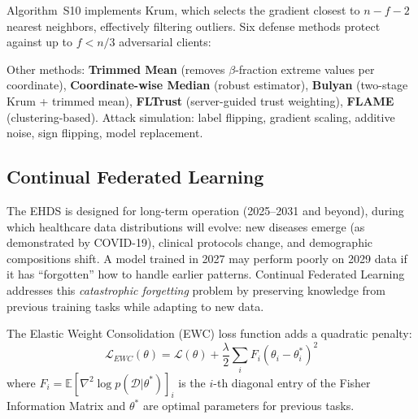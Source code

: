 \documentclass[conference,a4paper]{IEEEtran}
\begin{document}
Algorithm~S10 implements Krum, which selects the gradient closest to $n{-}f{-}2$ nearest neighbors, effectively filtering outliers. Six defense methods protect against up to $f < n/3$ adversarial clients:

\begin{figure}[htbp]
\centering
{}
\end{figure}

Other methods: \textbf{Trimmed Mean} (removes $\beta$-fraction extreme values per coordinate), \textbf{Coordinate-wise Median} (robust estimator), \textbf{Bulyan} (two-stage Krum + trimmed mean), \textbf{FLTrust} (server-guided trust weighting), \textbf{FLAME} (clustering-based). Attack simulation: label flipping, gradient scaling, additive noise, sign flipping, model replacement.

\subsection{Continual Federated Learning}

The EHDS is designed for long-term operation (2025--2031 and beyond), during which healthcare data distributions will evolve: new diseases emerge (as demonstrated by COVID-19), clinical protocols change, and demographic compositions shift. A model trained in 2027 may perform poorly on 2029 data if it has ``forgotten'' how to handle earlier patterns. Continual Federated Learning addresses this \textit{catastrophic forgetting} problem by preserving knowledge from previous training tasks while adapting to new data.

The Elastic Weight Consolidation (EWC) loss function adds a quadratic penalty:
\[
\mathcal{L}_{EWC}(\theta) = \mathcal{L}(\theta) + \frac{\lambda}{2} \sum_i F_i (\theta_i - \theta_i^*)^2
\]
where $F_i = \mathbb{E}[\nabla^2 \log p(\mathcal{D}|\theta^*)]_i$ is the $i$-th diagonal entry of the Fisher Information Matrix and $\theta^*$ are optimal parameters for previous tasks.
\end{document}
